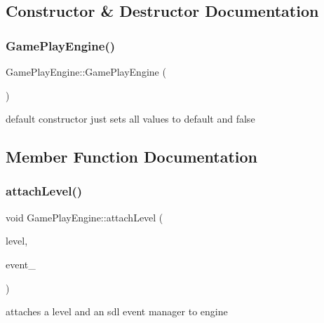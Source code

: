 \subsection{Constructor \& Destructor Documentation}
\hypertarget{class_game_play_engine_af4b9d34e0404f1eadec2de8050b35612}{}\label{class_game_play_engine_af4b9d34e0404f1eadec2de8050b35612} 
\subsubsection{\texorpdfstring{Game\+Play\+Engine()}{GamePlayEngine()}}
{\footnotesize\ttfamily Game\+Play\+Engine\+::\+Game\+Play\+Engine (\begin{DoxyParamCaption}{ }\end{DoxyParamCaption})}

default constructor just sets all values to default and false 

\subsection{Member Function Documentation}
\hypertarget{class_game_play_engine_a300998530f28b86679ced3b42b6ccf62}{}\label{class_game_play_engine_a300998530f28b86679ced3b42b6ccf62} 
\subsubsection{\texorpdfstring{attach\+Level()}{attachLevel()}}
{\footnotesize\ttfamily void Game\+Play\+Engine\+::attach\+Level (\begin{DoxyParamCaption}\item[{\hyperlink{class_pre_built_level}{Pre\+Built\+Level} $\ast$}]{level,  }\item[{S\+D\+L\+\_\+\+Event $\ast$}]{event\+\_\+ }\end{DoxyParamCaption})}

attaches a level and an sdl event manager to engine \hypertarget{class_game_play_engine_a07f3fd8aeb418e17dd448c8f663550fc}{}\label{class_game_play_engine_a07f3fd8aeb418e17dd448c8f663550fc} 
